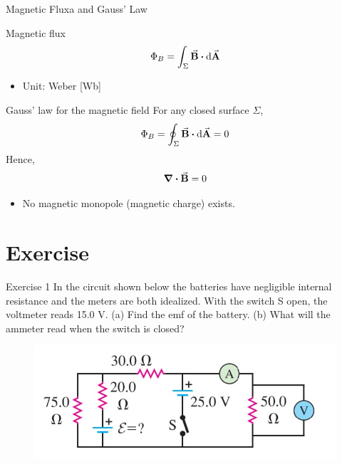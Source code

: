 \documentclass{beamer}
\begin{document}
\begin{frame}{Magnetic Fluxa and Gauss' Law}
    \begin{block}{Magnetic flux}
        \begin{equation}
            \Phi_B = \int_\Sigma \va{B} \vdot \dd{\va{A}}
        \end{equation}
    \end{block}
    \begin{itemize}
        \item Unit: Weber [Wb]
    \end{itemize}
    \vfill
    \begin{block}{Gauss' law for the magnetic field}
        For any closed surface $\Sigma$,
        \begin{equation}
            \Phi_B = \oint_\Sigma \va{B} \vdot \dd{\va{A}} = 0
        \end{equation}
        Hence,
        \begin{equation}
            \div{\va{B}} = 0
        \end{equation}
    \end{block}
    \begin{itemize}
        \item No magnetic monopole (magnetic charge) exists.
    \end{itemize}
\end{frame}




\section{Exercise}

\begin{frame}{Exercise 1}
    In the circuit shown below the batteries have negligible internal resistance and the meters are both idealized. With the switch S open, the voltmeter reads 15.0 V. 
    (a) Find the emf of the battery.
    (b) What will the ammeter read when the switch is closed?

    \begin{figure}[htbp]
        \centering
        \includegraphics[]{Images/ex1.jpg}    
    \end{figure}
\end{frame}
\end{document}
